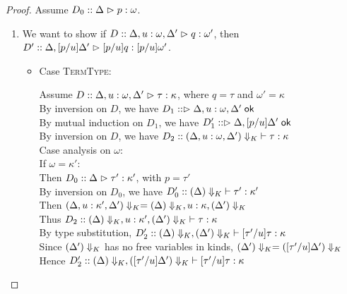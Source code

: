 \begin{proof}
  Assume $D_0 :: \judgeA{p}{\omega}$.
  \begin{enumerate}
  \item We want to show if $D :: \judgeA[{\Delta, u:\omega, \Delta'}]{q}{\omega'}$, then 
         $D' :: \judgeA[{\Delta, [p/u]\Delta'}]{[p/u]q}{[p/u]\omega'}$.
    \begin{itemize}
    \item Case \textsc{TermType}: 
      \begin{tabbedproof}
        \oo Assume $D :: \judgeA[{\Delta, u:\omega, \Delta'}]{\tau}{\kappa}$, 
            where $q = \tau$ and $\omega' = \kappa$ \\
        \ooo By inversion on $D$, we have $D_1 :: \judgeACtx{\Delta, u:\omega, \Delta'}$ \\
        \ooo By mutual induction on $D_1$, we have $D'_1 :: \judgeACtx{\Delta, [p/u]\Delta'}$ \\
        \ooo By inversion on $D$, we have 
                 $D_2 :: \judgeWK[\restrictkind{\Delta, u:\omega, \Delta'}]
                                 {\tau}{\kappa}$ \\
        \ooo Case analysis on $\omega$:\\
        \oooo If $\omega = \kappa'$: \\
        \ooooo Then $D_0 :: \judgeA[\Delta]{\tau'}{\kappa'}$, with $p = \tau'$ \\
        \ooooo By inversion on $D_0$, we have 
                $D'_0 :: \judgeWK[\restrictkind{\Delta}]{\tau'}{\kappa'}$ \\
        \ooooo Then $\restrictkind{\Delta, u:\kappa', \Delta'} = 
                       \restrictkind{\Delta}, u:\kappa, \restrictkind{\Delta'}$ \\
        \ooooo Thus $D_2 :: \judgeWK[\restrictkind{\Delta}, u:\kappa', \restrictkind{\Delta'}]
                                   {\tau}{\kappa}$ \\
        \ooooo By type substitution, 
                 $D'_2 :: \judgeWK[\restrictkind{\Delta}, \restrictkind{\Delta'}]
                                  {[\tau'/u]\tau}{\kappa}$ \\
        \ooooo Since $\restrictkind{\Delta'}$ has no free variables in kinds, 
                 $\restrictkind{\Delta'} = \restrictkind{[\tau'/u]\Delta'}$ \\
        \ooooo Hence $D'_2 :: \judgeWK[\restrictkind{\Delta}, \restrictkind{[\tau'/u]\Delta'}]
                                  {[\tau'/u]\tau}{\kappa}$ \\

\end{tabbedproof}
\end{itemize}
\end{enumerate}
\end{proof}
